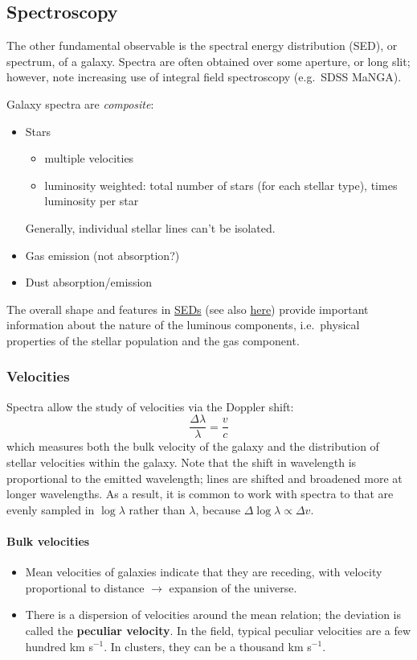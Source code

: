 \documentclass{article}
\newcommand{\mynotes}[1]{\textcolor{cadmiumgreen}{#1}}
\begin{document}
\subsection{Spectroscopy}
The other fundamental observable is the spectral energy distribution (SED),
or spectrum, of a galaxy. Spectra are often obtained over some aperture,
or long slit; however, note increasing use of integral field spectroscopy
(e.g.\ SDSS MaNGA).

Galaxy spectra are \textit{composite}:
\begin{itemize}
    \item Stars
        \begin{itemize}
            \item multiple velocities
            \item luminosity weighted: total number of
                stars (for each stellar type), times luminosity per star
        \end{itemize}
        Generally, individual stellar lines can't be isolated.
    \item Gas emission \mynotes{(not absorption?)}
    \item Dust absorption/emission
\end{itemize}

The overall shape and features in
\href{http://astronomy.nmsu.edu/holtz/a555/resources/galaxyspectra.gif}
{SEDs} (see also \href{http://astronomy.nmsu.edu/nicole/teaching/ASTR505/lectures/quickview.html}
{here}) provide important information about the nature of the luminous
components, i.e.\ physical properties of the stellar population and the gas
component.

\subsubsection{Velocities}
Spectra allow the study of velocities via the Doppler shift:
\[
    \frac{\Delta\lambda}{\lambda} = \frac{v}{c}
    \]
which measures both the bulk velocity of the galaxy and the distribution of
stellar velocities within the galaxy. Note that the shift in wavelength is
proportional to the emitted wavelength; lines are shifted and broadened more at
longer wavelengths. As a result, it is common to work with spectra to that are
evenly sampled in $\log \lambda$ rather than $\lambda$, because  $\Delta
\log\lambda \propto \Delta v$.

\paragraph{Bulk velocities}
\begin{itemize}
    \item Mean velocities of galaxies indicate that they are receding, with
        velocity proportional to distance $\rightarrow$ expansion of the
        universe.
    \item There is a dispersion of velocities around the mean relation; the
        deviation is called the \textbf{peculiar velocity}.  In the field,
        typical peculiar velocities are a few hundred km s$^{-1}$.  In
        clusters, they can be a thousand km s$^{-1}$.
\end{itemize}
\end{document}
